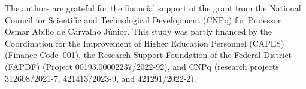 
The authors are grateful for the financial support of the grant
from the National Council for Scientific and Technological
Development (CNPq) for Professor Osmar Ab\'ilio de Carvalho
J\'unior. This study was partly financed by the Coordination for
the Improvement of Higher Education Personnel (CAPES) (Finance
Code~001), the Research Support Foundation of the Federal
District (FAPDF) (Project 00193.00002237/2022-92), and CNPq
(research projects 312608/2021-7, 421413/2023-9, and
421291/2022-2).
